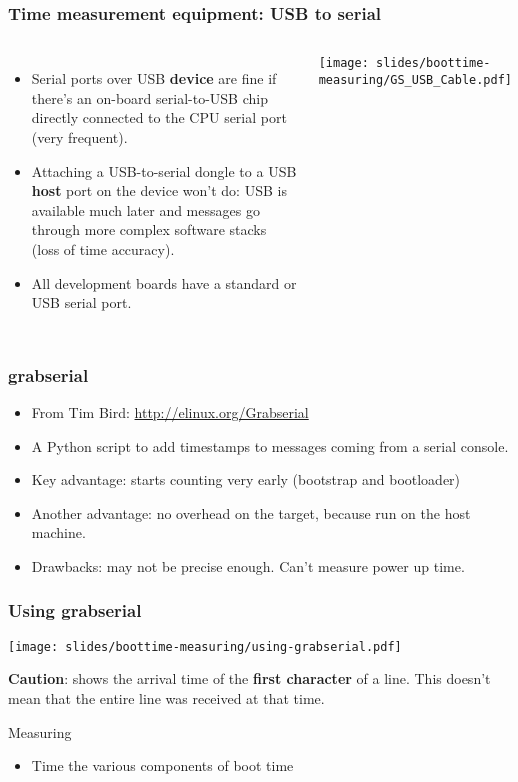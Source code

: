 \begin{frame}
\frametitle{Time measurement equipment: USB to serial}
\begin{columns}
	\begin{itemize}
	\item Serial ports over USB {\bf device} are fine if there's an on-board
      	      serial-to-USB chip directly connected to the CPU serial port (very frequent).
	\item Attaching a USB-to-serial dongle to a USB {\bf host} port on
      	      the device won't do: USB is available much later and messages
      	      go through more complex software stacks (loss of time accuracy). 
	\item All development boards have a standard or USB serial port.
	\end{itemize}
    	\texttt{[image: slides/boottime-measuring/GS\_USB\_Cable.pdf]}
\end{columns}
\end{frame}

\begin{frame}
\frametitle{grabserial}
\begin{itemize}
\item From Tim Bird: \url{http://elinux.org/Grabserial}
\item A Python script to add timestamps to messages coming from a
	serial console.
\item Key advantage: starts counting very early (bootstrap and bootloader)
\item Another advantage: no overhead on the target, because run on the host machine.
\item Drawbacks: may not be precise enough. Can't measure power up time.
\end{itemize}
\end{frame}

\begin{frame}
\frametitle{Using grabserial}
\begin{center}
    \texttt{[image: slides/boottime-measuring/using-grabserial.pdf]}
\end{center}
{\small
{\bf Caution}:  shows the arrival time of the 
{\bf first character} of a line. This doesn't mean that the entire line
was received at that time.}
\end{frame}

\setuplabframe
{Measuring}
{
\begin{itemize}
\item Time the various components of boot time
\end{itemize}
}
